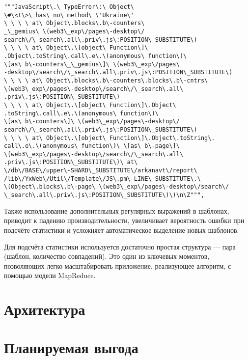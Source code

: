 \begin{center}
  \begin{verbatim}
"""JavaScript\.\ TypeError\:\ Object\
\#\<t\>\ has\ no\ method\ \'Ukraine\'
\ \ \ \ at\ Object\.blocks\.b\-counters\
_\_gemius\ \(web3\_exp\/pages\-desktop\/
search\/\_search\.all\.priv\.js\:POSITION\_SUBSTITUTE\)
\ \ \ \ at\ Object\.\[object\ Function\]\
.Object\.toString\.call\.e\.\(anonymous\ function\)\
\[as\ b\-counters\_\_gemius\]\ \(web3\_exp\/pages\
-desktop\/search\/\_search\.all\.priv\.js\:POSITION\_SUBSTITUTE\)
\ \ \ \ at\ Object\.blocks\.b\-counters\.blocks\.b\-cntrs\
\(web3\_exp\/pages\-desktop\/search\/\_search\.all\
.priv\.js\:POSITION\_SUBSTITUTE\)
\ \ \ \ at\ Object\.\[object\ Function\]\.Object\
.toString\.call\.e\.\(anonymous\ function\)\
\[as\ b\-counters\]\ \(web3\_exp\/pages\-desktop\/
search\/\_search\.all\.priv\.js\:POSITION\_SUBSTITUTE\)
\ \ \ \ at\ Object\.\[object\ Function\]\.Object\.toString\.
call\.e\.\(anonymous\ function\)\ \[as\ b\-page\]\
\(web3\_exp\/pages\-desktop\/search\/\_search\.all\
.priv\.js\:POSITION\_SUBSTITUTE\)\ at\
\/db\/BASE\/upper\-SHARD\_SUBSTITUTE\/arkanavt\/report\
/lib\/YxWeb\/Util\/Template\/JS\.pm\ LINE\_SUBSTITUTE\.\
\(Object\.blocks\.b\-page\ \(web3\_exp\/pages\-desktop\/search\/
\_search\.all\.priv\.js\:POSITION\_SUBSTITUTE\)\)\n\Z""",
  \end{verbatim}
\end{center}

Также использование дополнительных регулярных выражений в шаблонах, приводит
к падению производительности, увеличивает вероятность ошибки при подсчёте
статистики и усложняет автоматическое выделение новых шаблонов.

Для подсчёта статистики используется достаточно простая структура --- пара
(шаблон, количество совпадений). Это один из ключевых моментов, позволяющих
легко масштабировать приложение, реализующее алгоритм,
с помощью модели MapReduce.

\section{Архитектура}
\section{Планируемая выгода}
